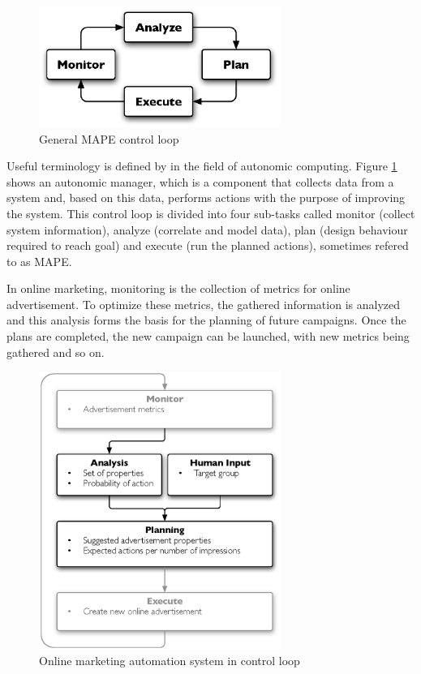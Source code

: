 \documentclass[a4paper]{article}
\begin{document}
\begin{figure}[htb]
\centering
\includegraphics[width=0.7\textwidth]{mape.eps}
\caption{General MAPE control loop}
\label{fig:MAPE}
\end{figure}

Useful terminology is defined by \citet{IBM2006} in the field of autonomic computing. Figure \ref{fig:MAPE} shows an autonomic
manager, which is a component that collects data from a system and, based on this data, performs actions with the purpose of 
improving the system. This control loop is divided into four sub-tasks called monitor (collect system information), analyze 
(correlate and model data), plan (design behaviour required to reach goal) and execute (run the planned actions), sometimes 
refered to as MAPE.

In online marketing, monitoring is the collection of metrics for online advertisement. To optimize these metrics, the gathered 
information is analyzed and this analysis forms the basis for the planning of future campaigns. Once the plans are completed, the 
new campaign can be launched, with new metrics being gathered and so on.

\begin{figure}[h!]
\centering
\includegraphics[width=0.7\textwidth]{mape-marketing.eps}
\caption{Online marketing automation system in control loop}
\label{fig:MAPEMarketing}
\end{figure}
\end{document}
